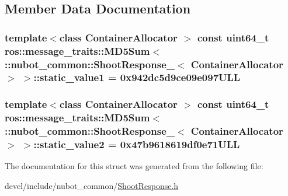 \subsection{Member Data Documentation}
\hypertarget{structros_1_1message__traits_1_1MD5Sum_3_01_1_1nubot__common_1_1ShootResponse___3_01ContainerAllocator_01_4_01_4_ac31bb8c3216fc8efbca4f20a16e3eccb}{
\subsubsection[{static\-\_\-value1}]{\setlength{\rightskip}{0pt plus 5cm}template$<$class Container\-Allocator $>$ const uint64\-\_\-t ros\-::message\-\_\-traits\-::\-M\-D5\-Sum$<$ \-::{\bf nubot\-\_\-common\-::\-Shoot\-Response\-\_\-}$<$ Container\-Allocator $>$ $>$\-::static\-\_\-value1 = 0x942dc5d9ce09e097\-U\-L\-L\hspace{0.3cm}{\ttfamily [static]}}}\label{structros_1_1message__traits_1_1MD5Sum_3_01_1_1nubot__common_1_1ShootResponse___3_01ContainerAllocator_01_4_01_4_ac31bb8c3216fc8efbca4f20a16e3eccb}
\hypertarget{structros_1_1message__traits_1_1MD5Sum_3_01_1_1nubot__common_1_1ShootResponse___3_01ContainerAllocator_01_4_01_4_a9504aa84a07e5c8cb978cc55d9b1167e}{
\subsubsection[{static\-\_\-value2}]{\setlength{\rightskip}{0pt plus 5cm}template$<$class Container\-Allocator $>$ const uint64\-\_\-t ros\-::message\-\_\-traits\-::\-M\-D5\-Sum$<$ \-::{\bf nubot\-\_\-common\-::\-Shoot\-Response\-\_\-}$<$ Container\-Allocator $>$ $>$\-::static\-\_\-value2 = 0x47b9618619df0e71\-U\-L\-L\hspace{0.3cm}{\ttfamily [static]}}}\label{structros_1_1message__traits_1_1MD5Sum_3_01_1_1nubot__common_1_1ShootResponse___3_01ContainerAllocator_01_4_01_4_a9504aa84a07e5c8cb978cc55d9b1167e}


The documentation for this struct was generated from the following file\-:\begin{DoxyCompactItemize}
\item 
devel/include/nubot\-\_\-common/\hyperlink{ShootResponse_8h}{Shoot\-Response.\-h}\end{DoxyCompactItemize}

